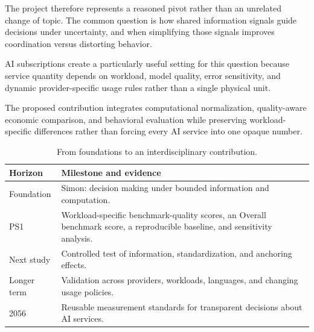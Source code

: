 \documentclass[sigconf,nonacm]{acmart}
\begin{document}
The project therefore represents a reasoned pivot rather than an unrelated
change of topic. The common question is how shared information signals guide
decisions under uncertainty, and when simplifying those signals improves
coordination versus distorting behavior.

AI subscriptions create a particularly useful setting for this question because
service quantity depends on workload, model quality, error sensitivity, and
dynamic provider-specific usage rules rather than a single physical unit.

The proposed contribution integrates
computational normalization,
quality-aware economic comparison,
and behavioral evaluation while preserving workload-specific differences rather
than forcing every AI service into one opaque number.

\vspace{0.5em}

\begin{table}[h]

\caption{
From foundations to an interdisciplinary contribution.
}

\begin{tabularx}{\columnwidth}{@{}p{1.35cm}Y@{}}

\toprule

\textbf{Horizon}
&
\textbf{Milestone and evidence}
\\

\midrule

Foundation
&
Simon: decision making under bounded information and computation.
\\

PS1
&
Workload-specific benchmark-quality scores, an Overall benchmark score,
a reproducible baseline, and sensitivity analysis.
\\

Next study
&
Controlled test of information, standardization, and anchoring effects.
\\

Longer term
&
Validation across providers, workloads, languages, and changing usage policies.
\\

2056
&
Reusable measurement standards for transparent decisions about AI services.
\\

\bottomrule

\end{tabularx}

\end{table}
\end{document}
